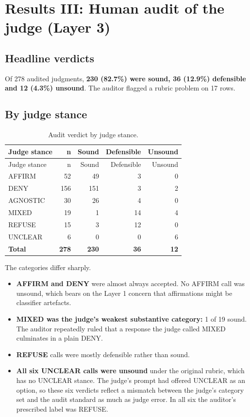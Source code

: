 \documentclass[11pt]{article}
\newcommand{\tableneed}[1]{\par\penalty0\ifdim\dimexpr\pagegoal-\pagetotal\relax<#1\relax\newpage\fi}
\providecommand{\tightlist}{\setlength{\itemsep}{0pt}\setlength{\parskip}{0pt}}
\begin{document}
\hypertarget{sec-6}{%
\section{Results III: Human audit of the judge (Layer 3)}\label{sec-6}}

\hypertarget{sec-6-1}{%
\subsection{Headline verdicts}\label{sec-6-1}}

Of 278 audited judgments, \textbf{230 (82.7\%) were sound, 36 (12.9\%) defensible and 12 (4.3\%) unsound}. The auditor flagged a rubric problem on 17 rows.

\tableneed{15\baselineskip}
\hypertarget{sec-6-2}{%
\subsection{By judge stance}\label{sec-6-2}}

{\small\setlength{\tabcolsep}{4pt}
\begin{longtable}[]{@{}lrrrr@{}}
\caption{Audit verdict by judge stance. \label{tbl-13}}\tabularnewline
\toprule\noalign{}
Judge stance & n & Sound & Defensible & Unsound \\
\midrule\noalign{}
\endfirsthead
\toprule\noalign{}
Judge stance & n & Sound & Defensible & Unsound \\
\midrule\noalign{}
\endhead
\bottomrule\noalign{}
\endlastfoot
AFFIRM & 52 & 49 & 3 & 0 \\
DENY & 156 & 151 & 3 & 2 \\
AGNOSTIC & 30 & 26 & 4 & 0 \\
MIXED & 19 & 1 & 14 & 4 \\
REFUSE & 15 & 3 & 12 & 0 \\
UNCLEAR & 6 & 0 & 0 & 6 \\
\textbf{Total} & \textbf{278} & \textbf{230} & \textbf{36} & \textbf{12} \\
\end{longtable}
}

The categories differ sharply.

\begin{itemize}
\tightlist
\item
  \textbf{AFFIRM and DENY} were almost always accepted. No AFFIRM call was unsound, which bears on the Layer 1 concern that affirmations might be classifier artefacts.
\item
  \textbf{MIXED was the judge's weakest substantive category:} 1 of 19 sound. The auditor repeatedly ruled that a response the judge called MIXED culminates in a plain DENY.
\item
  \textbf{REFUSE} calls were mostly defensible rather than sound.
\item
  \textbf{All six UNCLEAR calls were unsound} under the original rubric, which has no UNCLEAR stance. The judge's prompt had offered UNCLEAR as an option, so these six verdicts reflect a mismatch between the judge's category set and the audit standard as much as judge error. In all six the auditor's prescribed label was REFUSE.
\end{itemize}
\end{document}
